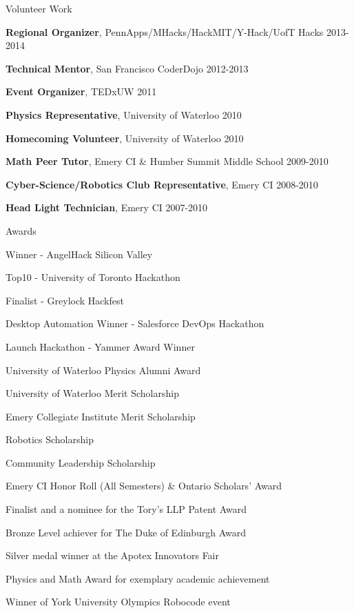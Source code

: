 \documentclass{resume}
\begin{document}
  \begin{rSection}{Volunteer Work}

    \begin{rSubListing}
      \item {{\bfseries Regional Organizer}, PennApps/MHacks/HackMIT/Y-Hack/UofT Hacks \hfill 2013-2014}
      \item {{\bfseries Technical Mentor}, San Francisco CoderDojo \hfill 2012-2013}
      \item {{\bfseries Event Organizer}, TEDxUW \hfill 2011}
      \item {{\bfseries Physics Representative}, University of Waterloo \hfill 2010}
      \item {{\bfseries Homecoming Volunteer}, University of Waterloo \hfill 2010}
      \item {{\bfseries Math Peer Tutor}, Emery CI \& Humber Summit Middle School \hfill 2009-2010}
      \item {{\bfseries Cyber-Science/Robotics Club Representative}, Emery CI \hfill 2008-2010}
      \item {{\bfseries Head Light Technician}, Emery CI \hfill 2007-2010}
    \end{rSubListing}

  \end{rSection}


  \begin{rSection}{Awards}

    \begin{rSubListing}
      \item Winner - AngelHack Silicon Valley
      \item Top10 - University of Toronto Hackathon
      \item Finalist - Greylock Hackfest
      \item Desktop Automation Winner - Salesforce DevOps Hackathon
      \item Launch Hackathon - Yammer Award Winner
      \item University of Waterloo Physics Alumni Award
      \item University of Waterloo Merit Scholarship
      \item Emery Collegiate Institute Merit Scholarship
      \item Robotics Scholarship
      \item Community Leadership Scholarship
      \item Emery CI Honor Roll (All Semesters) \& Ontario Scholars’ Award
      \item Finalist and a nominee for the Tory’s LLP Patent Award
      \item Bronze Level achiever for The Duke of Edinburgh Award
      \item Silver medal winner at the Apotex Innovators Fair
      \item Physics and Math Award for exemplary academic achievement
      \item Winner of York University Olympics Robocode event
    \end{rSubListing}

  \end{rSection}
\end{document}
